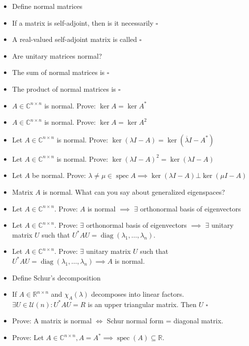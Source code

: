 \documentclass[a4paper]{article}
\begin{document}
\begin{itemize}
  \item Define normal matrices
  \item If a matrix is self-adjoint, then is it necessarily $\square{}$
  \item A real-valued self-adjoint matrix is called $\square{}$
  \item Are unitary matrices normal?
  \item The sum of normal matrices is $\square{}$
  \item The product of normal matrices is $\square{}$
  \item $A \in \mathbb C^{n \times n}$ is normal. Prove: $\ker{A} = \ker{A^*}$
  \item $A \in \mathbb C^{n \times n}$ is normal. Prove: $\ker{A} = \ker{A^2}$
  \item Let $A \in \mathbb C^{n \times n}$ is normal. Prove: $\ker(\lambda I - A) = \ker(\overline{\lambda} I - A^*)$
  \item Let $A \in \mathbb C^{n \times n}$ is normal. Prove: $\ker(\lambda I - A)^2 = \ker(\lambda I - A)$
  \item Let $A$ be normal. Prove: $\lambda \neq \mu \in \operatorname{spec}{A} \implies \ker(\lambda I - A) \bot \ker(\mu I - A)$
  \item Matrix $A$ is normal. What can you say about generalized eigenspaces?
  \item Let $A \in \mathbb C^{n \times n}$. Prove: $A$ is normal $\implies$ $\exists$ orthonormal basis of eigenvectors
  \item Let $A \in \mathbb C^{n \times n}$. Prove: $\exists$ orthonormal basis of eigenvectors $\implies$ $\exists$ unitary matrix $U$ such that $U^* AU = \operatorname{diag}(\lambda_1, \dots, \lambda_n)$.
  \item Let $A \in \mathbb C^{n \times n}$. Prove: $\exists$ unitary matrix $U$ such that $U^* AU = \operatorname{diag}(\lambda_1, \dots, \lambda_n) \implies A$ is normal.
  \item Define Schur's decomposition
  \item If $A \in \mathbb R^{n \times n}$ and $\chi_A(\lambda)$ decomposes into linear factors. $\exists U \in \mathcal U(n): U^* AU = R$ is an upper triangular matrix. Then $U$ $\square{}$
  \item Prove: A matrix is normal $\iff$ Schur normal form = diagonal matrix.
  \item Prove: Let $A \in \mathbb C^{n \times n}, A = A^* \implies \operatorname{spec}(A) \subseteq \mathbb R$.

\end{itemize}
\end{document}
